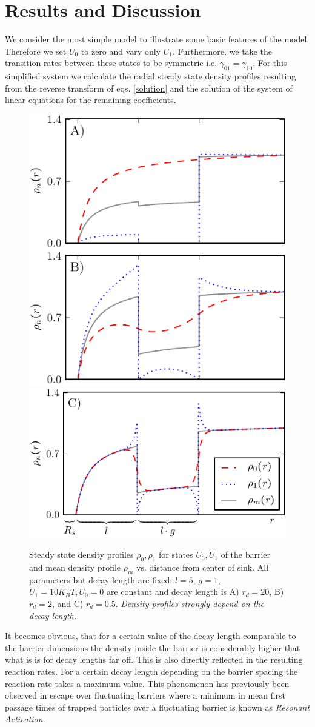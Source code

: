 \documentclass[twocolumn,superscriptaddress]{revtex4}
\begin{document}
\section{Results and Discussion}
We consider the most simple model to illustrate some basic features of the model. Therefore we set $U_0$ to zero and vary only $U_1$. Furthermore, we take the transition rates between these states to be symmetric i.e. $\gamma_{01}=\gamma_{10}$.
For this simplified system we calculate the radial steady state density profiles resulting from the reverse transform of eqs. \eqref{solution} and the solution of the system of linear equations for the remaining coefficients.
\begin{figure}[H]
\includegraphics[width= .45 \textwidth]{plots/d1.pdf}
\includegraphics[width= .45 \textwidth]{plots/d2.pdf}
\includegraphics[width= .45 \textwidth]{plots/d3.pdf}
\caption{Steady state density profiles $\rho_0, \rho_1$ for states $U_0, U_1$ of the barrier and mean density profile $\rho_m$ vs. distance from center of sink. All parameters but decay length are fixed: $l=5$, $g=1$, $U_1 = 10 K_B T, U_0 = 0$ are constant and decay length is A) $r_d = 20$, B) $r_d=2$, and C) $r_d=0.5$. \emph{Density profiles strongly depend on the decay length.}}
\label{fig1}
\end{figure}
It becomes obvious, that for a certain value of the decay length comparable to the barrier dimensions the density inside the barrier is considerably higher that what is is for decay lengths far off. This is also directly reflected in the resulting reaction rates. For a certain decay length depending on the barrier spacing the reaction rate takes a maximum value. This phenomenon has previously been observed in escape over fluctuating barriers where a minimum in mean first passage times of trapped particles over a fluctuating barrier is known as \emph{Resonant Activation}.
\end{document}
